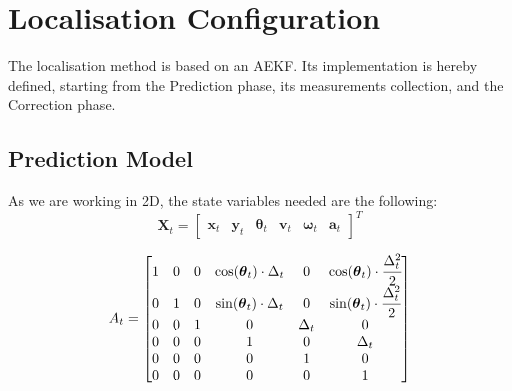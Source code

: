 \section{Localisation Configuration}
\label{sec:locConf}
\noindent
The localisation method is based on an \gls{AEKF}.
Its implementation is hereby defined, starting from the Prediction phase, its measurements collection, and the Correction phase.


\subsection{Prediction Model}

\noindent
As we are working in \gls{2D}, the state variables needed are the following:
$$
  \label{eq:state-transf}
\mathbf{X}_t=
\begin{bmatrix}
\mathbf{x}_t & \mathbf{y}_t & \boldsymbol \theta_t & \mathbf{v}_t & \boldsymbol \omega_t & \mathbf{a}_t
\end{bmatrix} ^T
$$


\begin{equation}
A_t
=
\begin{bmatrix}
1 & 0 & 0 & \cos(\boldsymbol \theta_t) \cdot \Delta_t & 0 & \cos(\boldsymbol \theta_t) \cdot  \cfrac{\Delta_t^2 }{2} \\
0 & 1 & 0 & \sin(\boldsymbol \theta_t) \cdot \Delta_t & 0 & \sin(\boldsymbol \theta_t) \cdot  \cfrac{\Delta_t^2 }{2} \\
0 & 0 & 1 & 0 & \Delta_t & 0 \\
0 & 0 & 0 & 1 & 0 & \Delta_t \\
0 & 0 & 0 & 0 & 1 & 0 \\
0 & 0 & 0 & 0 & 0 & 1
\end{bmatrix}
\end{equation}



